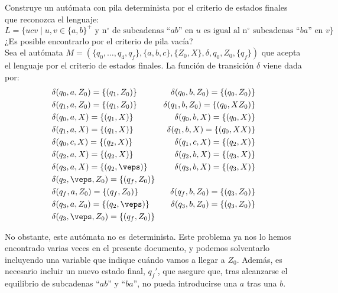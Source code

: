 \begin{ejercicio}\label{ej:1.5.21}
    Construye un autómata con pila determinista por el criterio de estados finales que reconozca el lenguaje:
    \begin{equation*}
        L = \{ucv\mid u,v\in {\{a,b\}}^{+} \text{\ y n$^\circ$ de subcadenas ``}ab \text{'' en\ } u \text{\ es igual al n$^\circ$ subcadenas ``} ba \text{'' en\ }v\}
    \end{equation*}
    ¿Es posible encontrarlo por el criterio de pila vacía?\\

    Sea el autómata $M = (\{q_0,\dots,q_4,q_f\},\{a,b,c\},\{Z_0,X\},\delta,q_0,Z_0,\{q_f\})$ que acepta el lenguaje por el criterio de estados finales.
    La función de transición $\delta$ viene dada por:
    \begin{align*}
        &\delta(q_0,a,Z_0) = \{(q_1,Z_0)\}
        &\delta(q_0,b,Z_0) = \{(q_0,Z_0)\} \\
        &\delta(q_1,a,Z_0) = \{(q_1,Z_0)\} 
        &\delta(q_1,b,Z_0) = \{(q_0,XZ_0)\} \\
        &\delta(q_0,a,X) = \{(q_1,X)\} 
        &\delta(q_0,b,X) = \{(q_0,X)\} \\
        &\delta(q_1,a,X) = \{(q_1,X)\} 
        &\delta(q_1,b,X) = \{(q_0,XX)\} \\
        &\delta(q_0,c,X) = \{(q_2,X)\} 
        &\delta(q_1,c,X) = \{(q_2,X)\} \\
        &\delta(q_2,a,X) = \{(q_2,X)\} 
        &\delta(q_2,b,X) = \{(q_3,X)\} \\
        &\delta(q_3,a,X) = \{(q_2,\veps)\} 
        &\delta(q_3,b,X) = \{(q_3,X)\} \\
        &\delta(q_2,\veps,Z_0) = \{(q_f,Z_0)\} \\
        &\delta(q_f,a,Z_0) = \{(q_f,Z_0)\} 
        &\delta(q_f,b,Z_0) = \{(q_3,Z_0)\} \\
        &\delta(q_3,a,Z_0) = \{(q_2,\veps)\}
        &\delta(q_3,b,Z_0) = \{(q_3,Z_0)\}\\
        &\delta(q_3,\veps,Z_0) = \{(q_f,Z_0)\}
    \end{align*}

    No obstante, este autómata no es determinista. Este problema ya nos lo hemos encontrado varias veces en el presente documento, y podemos solventarlo incluyendo una variable que indique cuándo vamos a llegar a $Z_0$. 
    Además, es necesario incluir un nuevo estado final, $q_f'$, que asegure que, tras alcanzarse el equilibrio de subcadenas ``$ab$'' y ``$ba$'', no pueda introducirse una $a$ tras una $b$.


\end{ejercicio}
